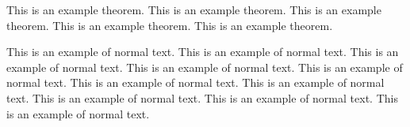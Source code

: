 \begin{refsection}
\begin{theorem}
  This is an example theorem.
  This is an example theorem.
  This is an example theorem.
  This is an example theorem.
  This is an example theorem.
\end{theorem}

This is an example of normal text.
This is an example of normal text.
This is an example of normal text.
This is an example of normal text.
This is an example of normal text.
This is an example of normal text.
This is an example of normal text.
This is an example of normal text.
This is an example of normal text.
This is an example of normal text.

\begin{singlespace}
  \PrintChapterBibliography
\end{singlespace}

\end{refsection}

